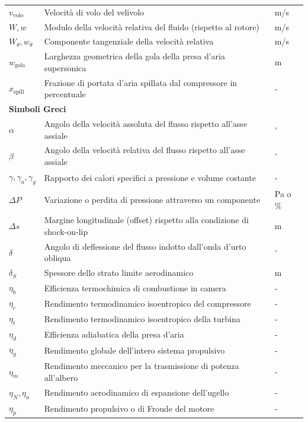 \begin{longtable}{p{} p{} p{}}
    $v_{\text{volo}}$ & Velocità di volo del velivolo & m/s \\[2px]
    $W, w$ & Modulo della velocità relativa del fluido (rispetto al rotore) & m/s \\[2px]
    $W_\theta, w_\theta$ & Componente tangenziale della velocità relativa & m/s \\[2px]
    $w_{\text{gola}}$ & Larghezza geometrica della gola della presa d'aria supersonica & m \\[2px]
    $x_{\text{spill}}$ & Frazione di portata d'aria spillata dal compressore in percentuale & - \\[6px]

    \multicolumn{3}{l}{\textbf{Simboli Greci}} \\[4px]
    $\alpha$ & Angolo della velocità assoluta del flusso rispetto all'asse assiale & $^\circ$ \\[2px]
    $\beta$ & Angolo della velocità relativa del flusso rispetto all'asse assiale & $^\circ$ \\[2px]
    $\gamma, \gamma_a, \gamma_g$ & Rapporto dei calori specifici a pressione e volume costante & - \\[2px]
    $\Delta P$ & Variazione o perdita di pressione attraverso un componente & Pa o \% \\[2px]
    $\Delta s$ & Margine longitudinale (offset) rispetto alla condizione di shock-on-lip & m \\[2px]
    $\delta$ & Angolo di deflessione del flusso indotto dall'onda d'urto obliqua & $^\circ$ \\[2px]
    $\delta_S$ & Spessore dello strato limite aerodinamico & m \\[2px]
    $\eta_b$ & Efficienza termochimica di combustione in camera & - \\[2px]
    $\eta_c$ & Rendimento termodinamico isoentropico del compressore & - \\[2px]
    $\eta_t$ & Rendimento termodinamico isoentropico della turbina & - \\[2px]
    $\eta_d$ & Efficienza adiabatica della presa d'aria & - \\[2px]
    $\eta_g$ & Rendimento globale dell'intero sistema propulsivo & - \\[2px]
    $\eta_m$ & Rendimento meccanico per la trasmissione di potenza all'albero & - \\[2px]
    $\eta_N, \eta_n$ & Rendimento aerodinamico di espansione dell'ugello & - \\[2px]
    $\eta_p$ & Rendimento propulsivo o di Froude del motore & - \\[2px]

\end{longtable}

